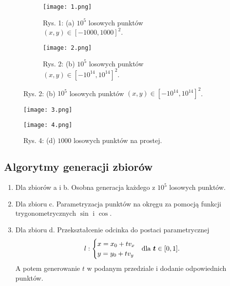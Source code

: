 \begin{figure}[!h]
    \centering
    \begin{subfigure}{.5\textwidth}
      \centering
      \texttt{[image: 1.png]}
      \caption*{Rys. 1: (a) $10^5$ losowych punktów $(x, y) \in \left[-1000,1000\right]^{2}$.}
      \label{fig:sub1}
    \end{subfigure}%
    \begin{subfigure}{.5\textwidth}
      \centering
      \texttt{[image: 2.png]}
      \caption*{Rys. 2: (b) $10^5$ losowych punktów $(x, y) \in \left[-10^{14},10^{14}\right]^{2}$.}
      \label{fig:sub2}
    \end{subfigure}
    \label{fig:test}
    \end{figure}
    \begin{figure}[!h]
    \centering
    \begin{minipage}{.5\textwidth}
      \centering
      \texttt{[image: 3.png]}
      \caption*{Rys. 3: (c) $1000$ losowych punktów leżących na okręgu.}
      \label{fig:test1}
    \end{minipage}%
    \begin{minipage}{.5\textwidth}
      \centering
      \texttt{[image: 4.png]}
      \caption*{Rys. 4: (d) $1000$ losowych punktów na prostej.}
      \label{fig:test2}
    \end{minipage}
    \end{figure}
\null
    \subsection{Algorytmy generacji zbiorów}
    \begin{enumerate}
    \item Dla zbiorów a i b. Osobna generacja każdego z $10^5$ losowych punktów.
    \item Dla zbioru c. Parametryzacja punktów na okręgu za pomocją funkcji trygonometrycznych $\sin$ i $\cos$.
    \item Dla zbioru d. Przekształcenie odcinka do postaci parametrycznej 
    $$
    l:\begin{cases}
      x = x_0 + tv_x& \smash{\raisebox{-1.6ex}{dla $\boldsymbol t \in [0,1]$.}}\\
      y = y_0 + tv_y
    \end{cases}
    $$
    A potem generowanie $t$ w podanym przedziale i dodanie odpowiednich punktów.
    \end{enumerate}
